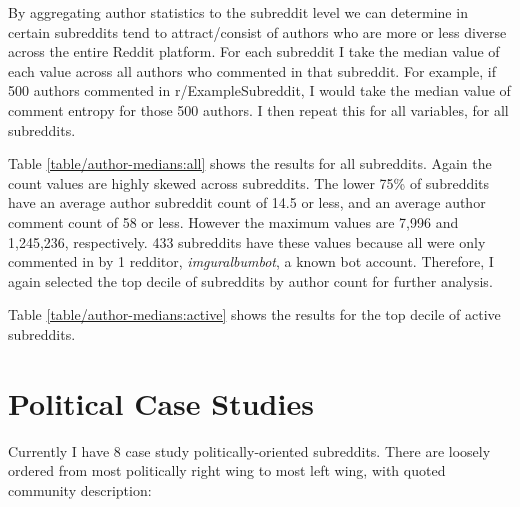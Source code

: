 \documentclass{article}
\begin{document}
By aggregating author statistics to the subreddit level we can determine in certain subreddits tend to attract/consist of authors who are more or less diverse across the entire Reddit platform. For each subreddit I take the median value of each value across all authors who commented in that subreddit. For example, if 500 authors commented in r/ExampleSubreddit, I would take the median value of comment entropy for those 500 authors. I then repeat this for all variables, for all subreddits.

Table \ref{table/author-medians:all} shows the results for all subreddits. Again the count values are highly skewed across subreddits. The lower 75\% of subreddits have an average author subreddit count of 14.5 or less, and an average author comment count of 58 or less. However the maximum values are 7,996 and 1,245,236, respectively. 433 subreddits have these values because all were only commented in by 1 redditor, \textit{imguralbumbot}, a known bot account. Therefore, I again selected the top decile of subreddits by author count for further analysis.

Table \ref{table/author-medians:active} shows the results for the top decile of active subreddits. 









\section{Political Case Studies}


Currently I have 8 case study politically-oriented subreddits. There are loosely ordered from most politically right wing to most left wing, with quoted community description:
\end{document}
